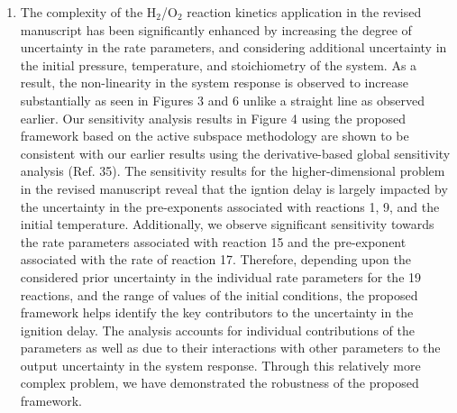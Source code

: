 \documentclass[11pt,final]{article}
\newcommand{\referee}[1]{\vspace{.1ex}\noindent{\textcolor{blue}{#1}}}
\begin{document}
\begin{enumerate}[wide, labelwidth=!, labelindent=0pt]
\item \referee{The authors find that the uncertainty in the ignition delay time is governed
by the uncertainty in H+O~2$<$=$>$~O+OH.
The connection between this reaction and the ignition delay time is so overwhelming that it
is probably responsible for the 1-dimensional active subspace reduction. Once the sensitivity
indices are computed, the one associated with this key reaction is largest.
To a combustion scientist, the fact that ignition delay time (and the uncertainty in the 
ignition delay time when pre-exponentials or activation energies are changed) is governed 
by H+O2~$<$=$>$~O+OH is obvious. This is THE key reaction in combustion kinetics with 10s 
(if not 100s) of studies dedicated to it (from the beginning of the field…). This is textbook k knowledge.
E.g. Figure 4 in Hong et al. (PCI 33, 2011, p. 309-316) shows that, indeed, this is the key 
reaction in sensitivity (by a large margin…). That figure is a "sensitivity analysis" 
which one can accomplish easily.
So, if this is the case, is the authors' reduction framework working because the nonlinear system
is really "simple" in its response to varying parameters}

\noindent The complexity of the H$_2$/O$_2$ reaction kinetics application in the revised manuscript has been significantly
enhanced by increasing the degree of uncertainty in the rate parameters, and considering additional 
uncertainty in the
initial pressure, temperature, and stoichiometry of the system. As a result, the non-linearity in the system
response is observed to increase substantially as seen in Figures 3 and 6 unlike a straight line as 
observed earlier. Our sensitivity analysis results in Figure 4 using the proposed framework based on the
active subspace methodology are shown to be consistent with our earlier results using the derivative-based
global sensitivity analysis (Ref. 35). The sensitivity results for the higher-dimensional problem in the
revised manuscript reveal that the igntion delay is largely impacted by
the uncertainty in the pre-exponents associated with reactions 1, 9, and the initial temperature. Additionally,
we observe significant sensitivity towards the rate parameters associated with reaction 15 and the pre-exponent
associated with the rate of reaction 17. 
Therefore, depending upon the considered prior uncertainty in the individual rate parameters for the 19
reactions, and the range of values of the initial conditions, the proposed framework helps identify the
key contributors to the uncertainty in the ignition delay. The analysis accounts for individual 
contributions of the parameters as well as due to their interactions with other parameters to the 
output uncertainty in the system response. Through this relatively more complex
problem, we have demonstrated the robustness of the proposed framework. 


\end{enumerate}
\end{document}
